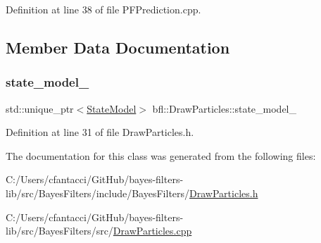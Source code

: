 Definition at line 38 of file P\+F\+Prediction.\+cpp.



\subsection{Member Data Documentation}
\mbox{\label{classbfl_1_1DrawParticles_a4acbc6e750895a3a27e68d0a9656b8cf}} 
\subsubsection{\texorpdfstring{state\+\_\+model\+\_\+}{state\_model\_}}
{\footnotesize\ttfamily std\+::unique\+\_\+ptr$<$\mbox{\hyperlink{classbfl_1_1StateModel}{State\+Model}}$>$ bfl\+::\+Draw\+Particles\+::state\+\_\+model\+\_\+\hspace{0.3cm}{\ttfamily [protected]}}



Definition at line 31 of file Draw\+Particles.\+h.



The documentation for this class was generated from the following files\+:\begin{DoxyCompactItemize}
\item 
C\+:/\+Users/cfantacci/\+Git\+Hub/bayes-\/filters-\/lib/src/\+Bayes\+Filters/include/\+Bayes\+Filters/\mbox{\hyperlink{DrawParticles_8h}{Draw\+Particles.\+h}}\item 
C\+:/\+Users/cfantacci/\+Git\+Hub/bayes-\/filters-\/lib/src/\+Bayes\+Filters/src/\mbox{\hyperlink{DrawParticles_8cpp}{Draw\+Particles.\+cpp}}\end{DoxyCompactItemize}
